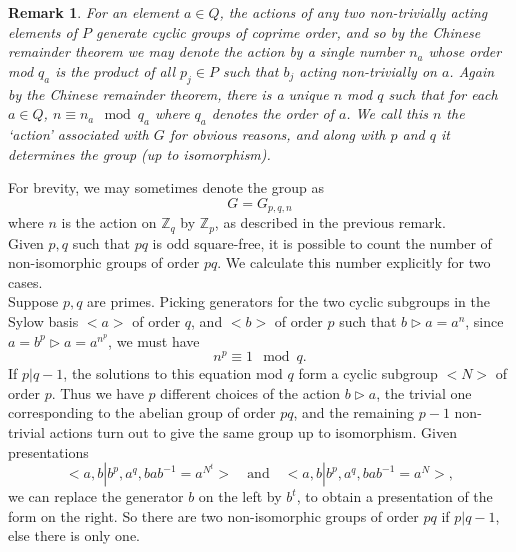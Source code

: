 \documentclass[11pt]{book}
\theoremstyle{Rem}
\newtheorem{Rem}[theorem]{Remark}
\theoremstyle{definition}
\numberwithin{equation}{section}
\newcommand\hit{\triangleright}
\newcommand\inv{^{-1}}
\newcommand\ZZ{\mathbb Z}
\begin{document}
\begin{Rem}\label{chinese}
For an element $a\in Q$, the actions of any two non-trivially acting elements of $P$ generate cyclic groups of coprime order, and so by the Chinese remainder theorem we may denote the action by a single number $n_a$ whose order mod $q_a$ is the product of all $p_j\in P$ such that $b_j$ acting non-trivially on $a$. Again by the Chinese remainder theorem, there is a unique $n$ mod $q$ such that for each $a \in Q$, $n\equiv n_a \mod q_a$ where $q_a$ denotes the order of $a$. We call this $n$ the `action' associated with $G$ for obvious reasons, and along with $p$ and $q$ it determines the group (up to isomorphism).
\end{Rem}
For brevity, we may sometimes denote the group as \begin{equation}
	G = G_{p,q,n}
\end{equation}where $n$ is the action on $\ZZ_q$ by $\ZZ_p$, as described in the previous remark.\\
Given $p,q$ such that $pq$ is odd square-free, it is possible to count the number of non-isomorphic groups of order $pq$. We calculate this number explicitly for two cases.\\
Suppose $p,q$ are primes. Picking generators for the two cyclic subgroups in the Sylow basis $<a>$ of order $q$, and $<b>$ of order $p$ such that $b\hit a=a^n$, since $a = b^p\hit a = a^{n^p}$, we must have\begin{equation}
	n^p\equiv 1 \mod q.
\end{equation} If $p|q-1$, the solutions to this equation mod $q$ form a cyclic subgroup $<N>$ of order $p$. Thus we have $p$ different choices of the action $b\hit a$, the trivial one corresponding to the abelian group of order $pq$, and the remaining $p-1$ non-trivial actions turn out to give the same group up to isomorphism. Given presentations \begin{equation}
	<a, b | b^p, a^q, bab\inv = a^{N^t}>\quad \text{and} \quad <a, b | b^p, a^q, bab\inv = a^N>,
\end{equation}
we can replace the generator $b$ on the left  by $b^t$, to obtain a presentation of the form on the right. So there are two non-isomorphic groups of order $pq$ if $p|q-1$, else there is only one.
\end{document}
